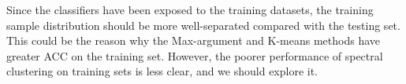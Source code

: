 \documentclass[12pt]{article}
\begin{document}
        Since the classifiers have been exposed to the training datasets, the training sample distribution should be more well-separated compared with the testing set. This could be the reason why the Max-argument and K-means methods have greater ACC on the training set. However, the poorer performance of spectral clustering on training sets is less clear, and we should explore it.
        \begin{figure}[htpb]
            \centering
             \\  
\end{figure}
\end{document}
